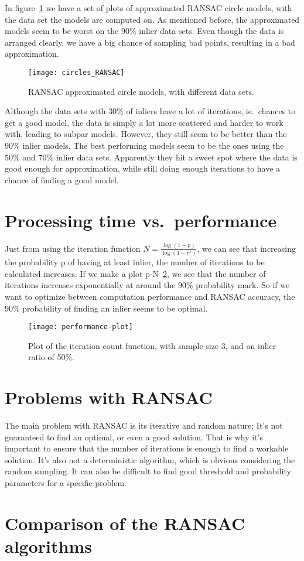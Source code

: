 In figure~\ref{fig:circles_RANSAC} we have a set of plots of approximated
RANSAC circle models, with the data set the models are computed on. As
mentioned before, the approximated models seem to be worst on the 90\% inlier
data sets. Even though the data is arranged clearly, we have a big chance of
sampling bad points, resulting in a bad approximation.

\begin{figure}[H]
  \centering
  \texttt{[image: circles\_RANSAC]}
  \caption{RANSAC approximated circle models, with different data sets.}
\label{fig:circles_RANSAC}
\end{figure}

Although the data sets with 30\% of inliers have a lot of iterations, ie.\
chances to get a good model, the data is simply a lot more scattered and harder
to work with, leading to subpar models. However, they still seem to be better
than the 90\% inlier models. The best performing models seem to be the ones
using the 50\% and 70\% inlier data sets. Apparently they hit a sweet spot
where the data is good enough for approximation, while still doing enough
iterations to have a chance of finding a good model.

\section{Processing time vs.\ performance}

Just from using the iteration function \( N = \frac{\log(1-p)}{\log(1-r^s)} \),
we can see that increasing the probability p of having at least inlier, the
number of iterations to be calculated increases. If we make a plot
p-N~\ref{fig:performance-plot}, we see
that the number of iterations increases exponentially at around the 90\%
probability mark. So if we want to optimize between computation performance and
RANSAC accuracy, the 90\% probability of finding an inlier seems to be optimal.

\begin{figure}[H]
  \centering
  \texttt{[image: performance-plot]}
  \caption{Plot of the iteration count function, with sample size 3, and an
  inlier ratio of 50\%.}
\label{fig:performance-plot}
\end{figure}

\section{Problems with RANSAC}

The main problem with RANSAC is its iterative and random nature; It's not
guaranteed to find an optimal, or even a good solution. That is why it's
important to ensure that the number of iterations is enough to find a workable
solution. It's also not a deterministic algorithm, which is obvious considering
the random sampling.  It can also be difficult to find good threshold and
probability parameters for a specific problem.

\section{Comparison of the RANSAC algorithms}
